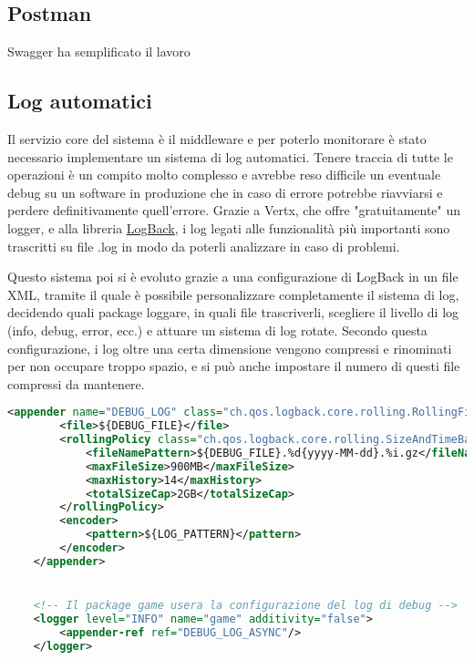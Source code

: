 \subsection{Postman}

Swagger ha semplificato il lavoro 

\subsection{Log automatici}

Il servizio core del sistema è il middleware e per poterlo monitorare è stato necessario implementare un sistema di log automatici. Tenere traccia di tutte le operazioni è un compito molto complesso e avrebbe reso difficile un eventuale debug su un software in produzione che in caso di errore potrebbe riavviarsi e perdere definitivamente quell'errore.
Grazie a Vertx, che offre "gratuitamente" un logger, e alla libreria \href{https://mvnrepository.com/artifact/ch.qos.logback/logback-classic}{\underline{LogBack}}, i log legati alle funzionalità più importanti sono trascritti su file .log in modo da poterli analizzare in caso di problemi.

Questo sistema poi si è evoluto grazie a una configurazione di LogBack in un file XML, tramite il quale è possibile personalizzare completamente il sistema di log, decidendo quali package loggare, in quali file trascriverli, scegliere il livello di log (info, debug, error, ecc.) e attuare un sistema di log rotate. Secondo questa configurazione, i log oltre una certa dimensione vengono compressi e rinominati per non occupare troppo spazio, e si può anche impostare il numero di questi file compressi da mantenere.

\begin{lstlisting}[language=Xml, caption={File configurazione Log automatici}, label=list:xml_logback]
    <appender name="DEBUG_LOG" class="ch.qos.logback.core.rolling.RollingFileAppender">
        <file>${DEBUG_FILE}</file>
        <rollingPolicy class="ch.qos.logback.core.rolling.SizeAndTimeBasedRollingPolicy">
            <fileNamePattern>${DEBUG_FILE}.%d{yyyy-MM-dd}.%i.gz</fileNamePattern>
            <maxFileSize>900MB</maxFileSize>
            <maxHistory>14</maxHistory>
            <totalSizeCap>2GB</totalSizeCap>
        </rollingPolicy>
        <encoder>
            <pattern>${LOG_PATTERN}</pattern>
        </encoder>
    </appender>


    <!-- Il package game usera la configurazione del log di debug -->
    <logger level="INFO" name="game" additivity="false">
        <appender-ref ref="DEBUG_LOG_ASYNC"/>
    </logger>

\end{lstlisting}

